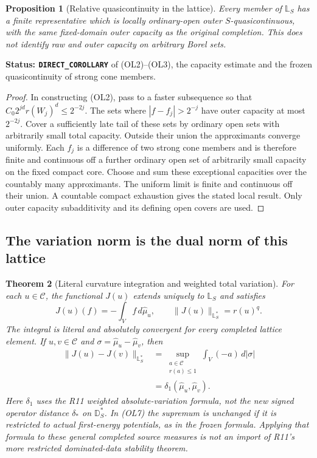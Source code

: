 \documentclass[11pt,a4paper]{article}
\numberwithin{equation}{section}
\newtheorem{theorem}{Theorem}[section]
\newtheorem{proposition}[theorem]{Proposition}
\theoremstyle{definition}
\theoremstyle{remark}
\begin{document}
\begin{proposition}[Relative quasicontinuity in the lattice]
\label{prop:r12-lattice-quasicontinuity}
Every member of $\mathbb L_S$ has a finite representative
which is locally ordinary-open outer $S$-quasicontinuous,
with the same fixed-domain outer capacity as the original
completion.  This does not identify raw and outer capacity
on arbitrary Borel sets.
\end{proposition}

\noindent\textbf{Status: \texttt{DIRECT\_COROLLARY}} of
\textup{(OL2)--(OL3)}, the capacity estimate and the frozen
quasicontinuity of strong cone members.

\begin{proof}
In constructing \textup{(OL2)}, pass to a faster subsequence
so that
$C_0 2^{jd}r(W_j)^d\le2^{-2j}$.
The sets where $|f-f_j|>2^{-j}$ have outer capacity at
most $2^{-2j}$.  Cover a sufficiently late tail of these
sets by ordinary open sets with arbitrarily small total
capacity.  Outside their union the approximants converge
uniformly.  Each $f_j$ is a difference of two strong cone
members and is therefore finite and continuous off a
further ordinary open set of arbitrarily small capacity
on the fixed compact core.  Choose and sum these exceptional
capacities over the countably many approximants.  The uniform
limit is finite and continuous off their union.  A countable
compact exhaustion gives the stated local result.  Only
outer capacity subadditivity and its defining open covers
are used.
\end{proof}

\subsection{The variation norm is the dual norm of this lattice}

\begin{theorem}[Literal curvature integration and weighted total variation]
\label{thm:r12-lattice-dual-variation}
For each $u\in\mathscr C$, the functional $J(u)$ extends
uniquely to $\mathbb L_S$ and satisfies
\[
 J(u)(f)=-\int_V f\,d\widehat\mu_u,\qquad
 \|J(u)\|_{\mathbb L_S^*}=r(u)^q.
 \tag{OL6}
\]
The integral is literal and absolutely convergent for every
completed lattice element.  If $u,v\in\mathscr C$ and
$\sigma=\widehat\mu_u-\widehat\mu_v$, then
\[
 \begin{split}
 \|J(u)-J(v)\|_{\mathbb L_S^*}
   &=\sup_{\substack{a\in\mathscr C\\r(a)\le1}}
                               \int_V(-a)\,d|\sigma|\\
   &=\delta_1(\widehat\mu_u,\widehat\mu_v).
 \end{split}
 \tag{OL7}
\]
Here $\delta_1$ uses the R11 weighted absolute-variation
formula, not the new signed operator distance $\delta_*$
on $\mathbb D_S^*$.  In \textup{(OL7)} the supremum is
unchanged if it is restricted to actual first-energy
potentials, as in the frozen formula.  Applying that
formula to these general completed source measures is
not an import of R11's more restricted dominated-data
stability theorem.
\end{theorem}
\end{document}
